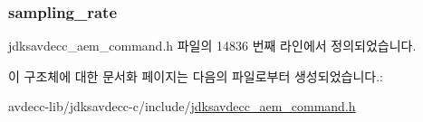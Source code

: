 \subsubsection[{\texorpdfstring{sampling\+\_\+rate}{sampling_rate}}]{ sampling\+\_\+rate}\hypertarget{structjdksavdecc__aem__command__set__sampling__rate__response_ab17c387eb7798bbb74ccfedd6f4cf21b}{}\label{structjdksavdecc__aem__command__set__sampling__rate__response_ab17c387eb7798bbb74ccfedd6f4cf21b}


jdksavdecc\+\_\+aem\+\_\+command.\+h 파일의 14836 번째 라인에서 정의되었습니다.



이 구조체에 대한 문서화 페이지는 다음의 파일로부터 생성되었습니다.\+:\begin{DoxyCompactItemize}
\item 
avdecc-\/lib/jdksavdecc-\/c/include/\hyperlink{jdksavdecc__aem__command_8h}{jdksavdecc\+\_\+aem\+\_\+command.\+h}\end{DoxyCompactItemize}
